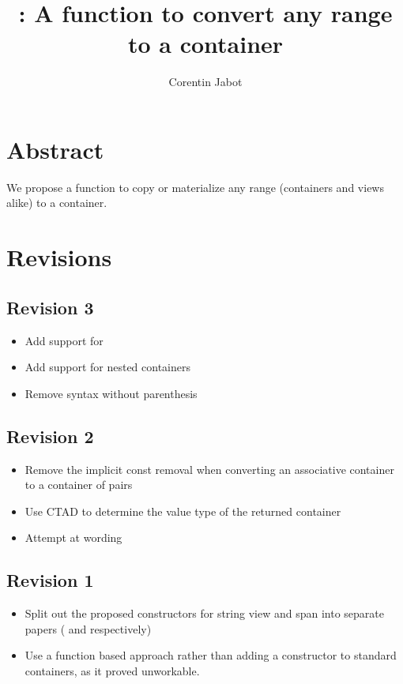 \documentclass{wg21}
\title{\tcode{ranges::to}: A function to convert any range to a container}
\author{Corentin Jabot}{corentin.jabot@gmail.com}
\begin{document}
\maketitle

\section{Abstract}

We propose a function to copy or materialize any range (containers and views alike) to a container.

\section{Revisions}

\subsection*{Revision 3}
\begin{itemize}
    \item Add support for 
    \item Add support for nested containers
    \item Remove syntax without parenthesis
\end{itemize}

\subsection*{Revision 2}
\begin{itemize}
	\item Remove the implicit const removal when converting an associative container to a container of pairs
	\item Use CTAD to determine the value type of the returned container
	\item Attempt at wording
\end{itemize}

\subsection*{Revision 1}
\begin{itemize}
	\item Split out the proposed constructors for string view and span into separate papers (\cite{P1391} and \cite{P1394} respectively)
	\item Use a function based approach rather than adding a constructor to standard containers, as it proved unworkable.
\end{itemize}
\newpage
\end{document}
